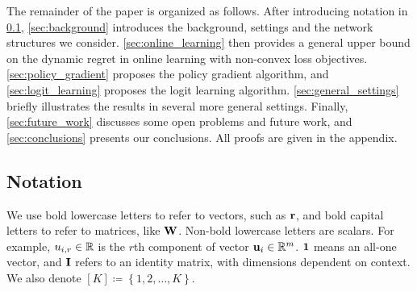 



The remainder of the paper is organized as follows. After introducing notation in \cref{subsec:notations},
 \cref{sec:background} introduces the background, settings and the network structures we consider. 
 \cref{sec:online_learning} then provides a general upper bound on the dynamic regret in online learning with non-convex loss objectives.
 \cref{sec:policy_gradient} proposes the policy gradient algorithm,
 and \cref{sec:logit_learning} proposes the logit learning algorithm. \cref{sec:general_settings} briefly illustrates the results in several more general settings. Finally, \cref{sec:future_work} discusses some open problems and future work, and \cref{sec:conclusions} presents our conclusions. All proofs are given in the appendix. %

\subsection{Notation}
\label{subsec:notations}
We use bold lowercase letters to refer to vectors, such as ${\mathbf{r}}$, and bold capital letters to refer to matrices, like ${\mathbf{W}}$. Non-bold lowercase letters are scalars. For example, $u_{i,r} \in {\mathbb{R}}$ is the $r$th component of vector ${\mathbf{u}}_i \in {\mathbb{R}}^m$. ${\mathbf{1}}$ means an all-one vector, and ${\mathbf{I}}$ refers to an identity matrix, with dimensions dependent on context. We also denote $[K] \coloneqq \left\{ 1,2, \dots, K \right\}$. 

